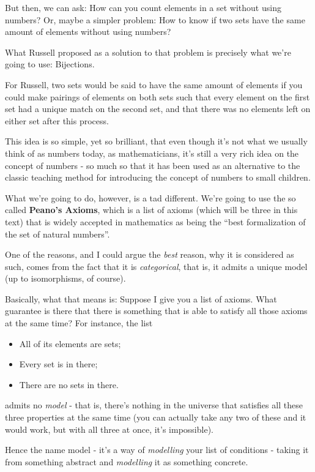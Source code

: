 But then, we can ask: How can you count elements in a set without using numbers? Or, maybe a simpler problem: How to know if two sets have the same amount of elements without using numbers?

What Russell proposed as a solution to that problem is precisely what we're going to use: Bijections.

For Russell, two sets would be said to have the same amount of elements if you could make pairings of elements on both sets such that every element on the first set had a unique match on the second set, and that there was no elements left on either set after this process.

This idea is so simple, yet so brilliant, that even though it's not what we usually think of as numbers today, as mathematicians, it's still a very rich idea on the concept of numbers - so much so that it has been used as an alternative to the classic teaching method for introducing the concept of numbers to small children.

\bigskip
What we're going to do, however, is a tad different. We're going to use the so called \textbf{Peano's Axioms}, which is a list of axioms (which will be three in this text) that is widely accepted in mathematics as being the ``best formalization of the set of natural numbers''.

One of the reasons, and I could argue the \textit{best} reason, why it is considered as such, comes from the fact that it is \textit{categorical}, that is, it admits a unique model (up to isomorphisms, of course).

Basically, what that means is: Suppose I give you a list of axioms. What guarantee is there that there is something that is able to satisfy all those axioms at the same time? For instance, the list
\begin{itemize}
	\item All of its elements are sets;
	\item Every set is in there;
	\item There are no sets in there.
\end{itemize} admits no \textit{model} - that is, there's nothing in the universe that satisfies all these three properties at the same time (you can actually take any two of these and it would work, but with all three at once, it's impossible).

Hence the name model - it's a way of \textit{modelling} your list of conditions - taking it from something abstract and \textit{modelling} it as something concrete.

